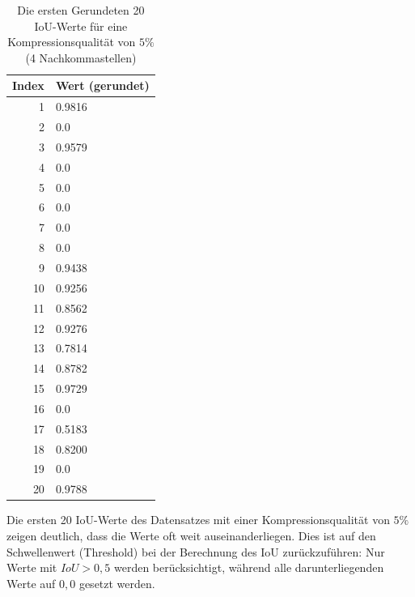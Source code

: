             \begin{table}[h!]
                \centering
                \begin{tabular}{rl}
                    \toprule
                    \textbf{Index} & \textbf{Wert (gerundet)} \\
                    \midrule
                    1  & 0.9816 \\
                    2  & 0.0 \\
                    3  & 0.9579 \\
                    4  & 0.0 \\
                    5  & 0.0 \\
                    6  & 0.0 \\
                    7  & 0.0 \\
                    8  & 0.0 \\
                    9  & 0.9438 \\
                    10 & 0.9256 \\
                    11 & 0.8562 \\
                    12 & 0.9276 \\
                    13 & 0.7814 \\
                    14 & 0.8782 \\
                    15 & 0.9729 \\
                    16 & 0.0 \\
                    17 & 0.5183 \\
                    18 & 0.8200 \\
                    19 & 0.0 \\
                    20 & 0.9788 \\
                    \bottomrule
                \end{tabular}
                \caption{Die ersten Gerundeten 20 IoU-Werte für eine Kompressionsqualität von $5\%$ (4 Nachkommastellen)}
                \label{tab:compression5}
            \end{table}

            Die ersten 20 IoU-Werte des Datensatzes mit einer Kompressionsqualität von $5\%$ zeigen deutlich, dass die Werte oft weit auseinanderliegen. Dies ist auf den Schwellenwert (Threshold) bei der Berechnung des IoU zurückzuführen: Nur Werte mit $IoU > 0,5$ werden berücksichtigt, während alle darunterliegenden Werte auf $0,0$ gesetzt werden.\\

